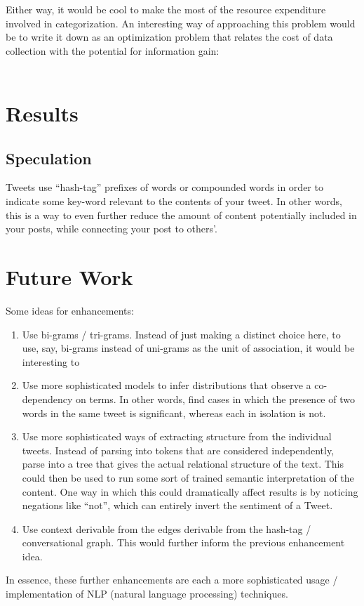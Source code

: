\documentclass[12pt,a4paper]{article}
\begin{document}
Either way, it would be cool to make the most of the resource expenditure involved in categorization.  An interesting way of approaching this problem would be to write it down as an optimization problem that relates the cost of data collection with the potential for information gain:

\begin{align*}
\end{align*}



\section { Results }


\subsection { Speculation }


Tweets use ``hash-tag'' prefixes of words or compounded words in order to indicate some key-word relevant to the contents of your tweet.  In other words, this is a way to even further reduce the amount of content potentially included in your posts, while connecting your post to others'.  


\section { Future Work}

Some ideas for enhancements:

\begin{enumerate}[1)]
\item Use bi-grams / tri-grams.  Instead of just making a distinct choice here, to use, say, bi-grams instead of uni-grams as the unit of association, it would be interesting to 

\item Use more sophisticated models to infer distributions that observe a co-dependency on terms.  In other words, find cases in which the presence of two words in the same tweet is significant, whereas each in isolation is not.

\item Use more sophisticated ways of extracting structure from the individual tweets.  Instead of parsing into tokens that are considered independently, parse into a tree that gives the actual relational structure of the text.  This could then be used to run some sort of trained semantic interpretation of the content.  One way in which this could dramatically affect results is by noticing negations like ``not'', which can entirely invert the sentiment of a Tweet.

\item Use context derivable from the edges derivable from the hash-tag / conversational graph.  This would further inform the previous enhancement idea.
\end{enumerate}

In essence, these further enhancements are each a more sophisticated usage / implementation of NLP (natural language processing) techniques. 
\end{document}
